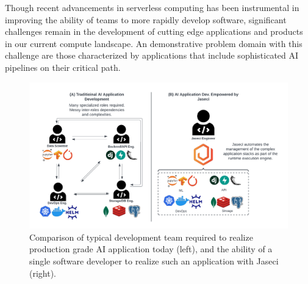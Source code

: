 Though recent advancements in serverless computing has been instrumental in improving the ability of teams to more rapidly develop software, significant challenges remain in the development of cutting edge applications and products in our current compute landscape.
An demonstrative problem domain with this challenge are those characterized by applications that include sophisticated AI pipelines on their critical path.

\begin{figure}[tb]
    \centering
    \includegraphics[width=\linewidth]{figures/team_sizes.pdf}
    \caption{Comparison of typical development team required to realize production grade AI application today (left), and the ability of a single software developer to realize such an application with Jaseci (right). }
    \label{fig:dev}
\end{figure}


